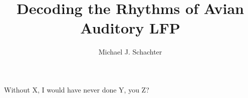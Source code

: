 \documentclass{ucbthesis}
\begin{document}

\title{Decoding the Rhythms of Avian Auditory LFP}
\author{Michael J. Schachter}


\maketitle
\approvalpage
\copyrightpage



\begin{frontmatter}

\begin{acknowledgements}

\begin{center}
Without X, I would have never done Y, you Z?
\end{center}

\end{acknowledgements}


\tableofcontents
\clearpage
\listoffigures
\clearpage
\listoftables



\end{frontmatter}

\pagestyle{headings}


















\printbibliography
\end{document}
